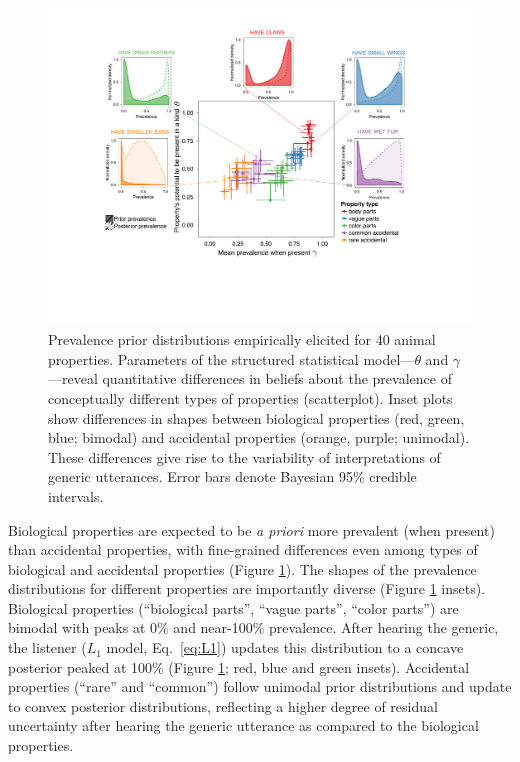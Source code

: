 \documentclass{pnastwo}
\begin{document}
\begin{article}
\begin{figure}
\centering
    \includegraphics[width=\columnwidth]{prevalence-asymmetry-scatterwDists-byItem.pdf}
    \caption{Prevalence prior distributions empirically elicited for 40 animal properties.
    Parameters of the structured statistical model---$\theta$ and $\gamma$---reveal quantitative differences in beliefs about the prevalence of conceptually different types of properties (scatterplot). 
    Inset plots show differences in shapes between biological properties (red, green, blue; bimodal) and accidental properties (orange, purple; unimodal).   
  These differences give rise to the variability of interpretations of generic utterances. 
      Error bars denote Bayesian 95\% credible intervals.
  }
  \label{fig:prior2}
\end{figure}


Biological properties are expected to be \emph{a priori} more prevalent (when present) than accidental properties, with fine-grained differences even among types of biological and accidental properties (Figure \ref{fig:prior2}).
The shapes of the prevalence distributions for different properties are importantly diverse (Figure \ref{fig:prior2} insets). 
Biological properties (``biological parts'', ``vague parts'', ``color parts'') are bimodal with peaks at 0\% and near-100\% prevalence. 
After hearing the generic, the listener ($L_1$ model, Eq.~\ref{eq:L1}) updates this distribution to a concave posterior  peaked at 100\% (Figure \ref{fig:prior2}; red, blue and green insets). 
Accidental properties (``rare'' and ``common'') follow unimodal prior distributions and update to convex posterior distributions, reflecting a higher degree of residual uncertainty after hearing the generic utterance as compared to the biological properties. 


\end{article}
\end{document}
